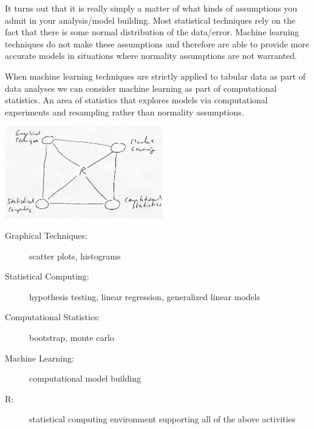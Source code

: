 \documentclass[a4paper,blends,pdf,colorBG,slideColor]{prosper}
\begin{document}
It turns out that it is really simply a matter of what kinds of assumptions you admit in your analysis/model building.  Most statistical techniques rely on the fact that there is some normal distribution of the data/error.  Machine learning techniques do not make these assumptions and therefore are able to provide more accurate models in situations where normality assumptions are not warranted.  

When machine learning techniques are strictly applied to tabular data as part of data analyses we can consider machine learning as part of computational statistics.  An
area of statistics that explores models via computational experiments and resampling rather than normality assumptions.

\es

\begin{center}
    \includegraphics[height=40mm]{figures/techniques.eps}
\end{center}
\begin{description}
\item[Graphical Techniques:] scatter plots, histograms
\item[Statistical Computing:] hypothesis testing, linear regression, generalized linear models
\item[Computational Statistics:] bootstrap, monte carlo
\item[Machine Learning:] computational model building
\item[R:] statistical computing environment supporting all of the above activities
\end{description}
\es
\end{document}
